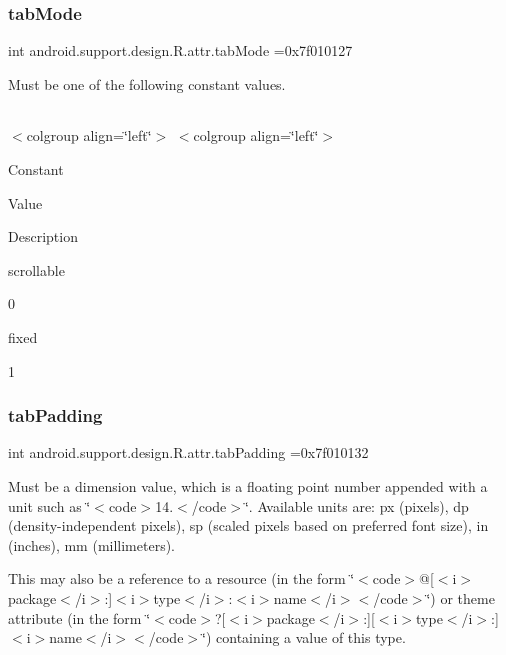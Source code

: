 \subsubsection{\texorpdfstring{tab\+Mode}{tabMode}}
{\footnotesize\ttfamily int android.\+support.\+design.\+R.\+attr.\+tab\+Mode =0x7f010127\hspace{0.3cm}{\ttfamily [static]}}

Must be one of the following constant values.

\tabulinesep=1mm
\begin{longtabu} spread 0pt [c]{*{0}{|X[-1]}|}
\hline
\end{longtabu}
$<$colgroup align=\char`\"{}left\char`\"{}$>$ $<$colgroup align=\char`\"{}left\char`\"{}$>$ 

Constant

Value

Description 

{\ttfamily scrollable}

0

{\ttfamily fixed}

1\mbox{\label{classandroid_1_1support_1_1design_1_1R_1_1attr_a1d4456538a96cc563b1041fe9af458b5}} 
\subsubsection{\texorpdfstring{tab\+Padding}{tabPadding}}
{\footnotesize\ttfamily int android.\+support.\+design.\+R.\+attr.\+tab\+Padding =0x7f010132\hspace{0.3cm}{\ttfamily [static]}}

Must be a dimension value, which is a floating point number appended with a unit such as \char`\"{}$<$code$>$14.\+5sp$<$/code$>$\char`\"{}. Available units are\+: px (pixels), dp (density-\/independent pixels), sp (scaled pixels based on preferred font size), in (inches), mm (millimeters). 

This may also be a reference to a resource (in the form \char`\"{}$<$code$>$@\mbox{[}$<$i$>$package$<$/i$>$\+:\mbox{]}$<$i$>$type$<$/i$>$\+:$<$i$>$name$<$/i$>$$<$/code$>$\char`\"{}) or theme attribute (in the form \char`\"{}$<$code$>$?\mbox{[}$<$i$>$package$<$/i$>$\+:\mbox{]}\mbox{[}$<$i$>$type$<$/i$>$\+:\mbox{]}$<$i$>$name$<$/i$>$$<$/code$>$\char`\"{}) containing a value of this type. \mbox{\label{classandroid_1_1support_1_1design_1_1R_1_1attr_a4daed894a5c7b644541f7c480e446a66}} 
